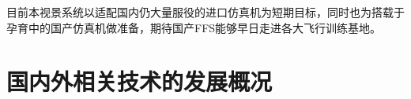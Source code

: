 \par
目前本视景系统以适配国内仍大量服役的进口仿真机为短期目标，同时也为搭载于孕育中的国产仿真机做准备，期待国产FFS能够早日走进各大飞行训练基地。
\section{国内外相关技术的发展概况}
